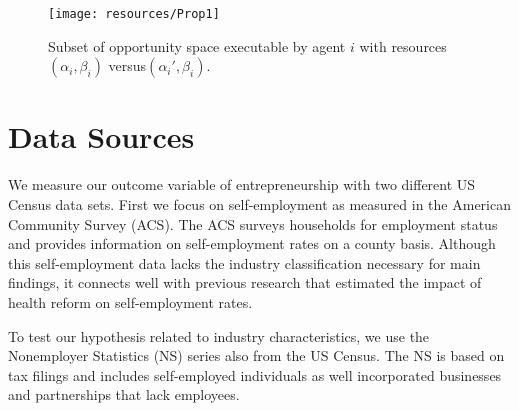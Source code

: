 \documentclass[12pt]{article}
\begin{document}
\begin{figure}[H]
	\centering
	\texttt{[image: resources/Prop1]}
	\caption{Subset of opportunity space executable by agent $i$ with resources $(\alpha_i,\beta_i)$ versus$(\alpha_i', \beta_i)$.}
	\label{fig:ideaSpace}
\end{figure}

\begin{comment}

Our last proposition describes the relative short and long term affect of a health care shock. 

\textbf{Proposition 4:} The relative increase in low versus high capital firms should attenuate over time. 

\textbf{Proof:} See Appendix A for a formal statement and proof

This follows from entrepreneurs having any memory of past opportunities. Immediately after the shock, opportunities in Figure \ref{fig:ideaSpace}'s striped region that occurred to the entrepreneur in the current time period as well as prior periods become feasible. In future periods, feasible opportunities are only drawn from the new ideas generated by the entrepreneur that period.

\end{comment}

\section{Data Sources}
\label{sec:data}


We measure our outcome variable of entrepreneurship with two different US Census data sets. First we focus on self-employment as measured in the American Community Survey (ACS). The ACS surveys households for employment status and provides information on self-employment rates on a county basis. Although this self-employment data lacks the industry classification necessary for main findings, it connects well with previous research that estimated the impact of health reform on self-employment rates. 

To test our hypothesis related to industry characteristics, we use the Nonemployer Statistics (NS) series also from the US Census. The NS is based on tax filings and includes self-employed individuals as well incorporated businesses and partnerships that lack employees. 
\end{document}
